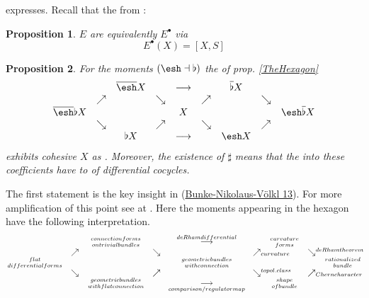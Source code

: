 \documentclass[12pt,titlepage]{article}
\def\mathrlap{\mathpalette\mathrlapinternal}
\def\mathrlapinternal#1#2{\rlap{$\mathsurround=0pt#1{#2}$}}
\newcommand{\itexarray}[1]{\begin{matrix}#1\end{matrix}}
\theoremstyle{plain}
\newtheorem{prop}{Proposition}
\theoremstyle{definition}
\theoremstyle{remark}
\begin{document}
expresses.
Recall that the  from :
\begin{prop}
\label{}\hypertarget{}{}
 $E$ are equivalently  $E^\bullet$ via
\begin{displaymath}
E^\bullet(X) = [X,S]
\end{displaymath}
\end{prop}
\begin{prop}
\label{DifferentialHexagon}\hypertarget{DifferentialHexagon}{}
For the moments $(\esh  \dashv \flat)$ the  of prop. \ref{TheHexagon}
\begin{displaymath}
\itexarray{
&& \overline{\esh } X && \stackrel{}{\longrightarrow} && \overline{\flat} X
\\
& \nearrow & & \searrow & & \nearrow_{} && \searrow
\\
\overline{\esh } \flat  X  && && X && && \esh  \overline{\flat} X
\\
& \searrow &  & \nearrow & & \searrow && \nearrow_{}
\\
&& \flat X && \longrightarrow && \esh  X
}
\end{displaymath}
exhibits cohesive  $X$ as .
Moreover, the existence of $\sharp$ means that the  into these coefficients have  to  of differential cocycles.
\end{prop}
The first statement is the key insight in (\hyperlink{BunkeNikolausVoelkl13}{Bunke-Nikolaus-Völkl 13}). For more amplification of this point see at .
Here the moments appearing in the hexagon have the following interpretation.
\begin{displaymath}
\itexarray{
&&  {{connectionforms}\atop{ontrivialbundles}} && \stackrel{deRhamdifferential}{\longrightarrow} && {{curvature}\atop{forms}}
\\
& \nearrow & & \searrow & & \nearrow_{\mathrlap{curvature}} && \searrow^{\mathrlap{deRhamtheorem}}
\\
{{flat}\atop{differentialforms}}  &&
&& {{geometricbundles}\atop{withconnection}} && &&
{{rationalized}\atop{bundle}}
\\
& \searrow &  & \nearrow & & \searrow^{\mathrlap{topol.class}} && \nearrow_{\mathrlap{Cherncharacter}}
\\
&& {{geometricbundles}\atop{withflatconnection}} && \underset{comparison/regulatormap}{\longrightarrow} && {{shape}\atop{ofbundle}}
}
\end{displaymath}
\end{document}
